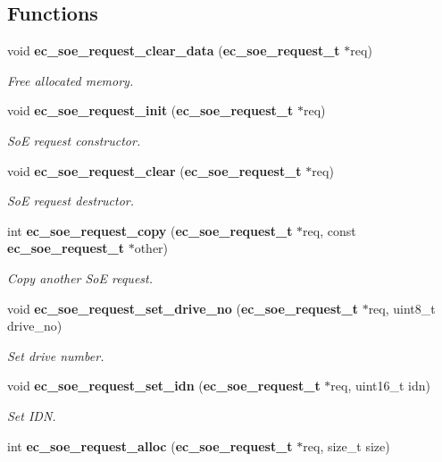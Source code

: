 \subsection*{Functions}
\begin{DoxyCompactItemize}
\item 
void {\bf ec\-\_\-soe\-\_\-request\-\_\-clear\-\_\-data} ({\bf ec\-\_\-soe\-\_\-request\-\_\-t} $\ast$req)
\begin{DoxyCompactList}\small\item\em Free allocated memory. \end{DoxyCompactList}\item 
void {\bf ec\-\_\-soe\-\_\-request\-\_\-init} ({\bf ec\-\_\-soe\-\_\-request\-\_\-t} $\ast$req)
\begin{DoxyCompactList}\small\item\em So\-E request constructor. \end{DoxyCompactList}\item 
void {\bf ec\-\_\-soe\-\_\-request\-\_\-clear} ({\bf ec\-\_\-soe\-\_\-request\-\_\-t} $\ast$req)
\begin{DoxyCompactList}\small\item\em So\-E request destructor. \end{DoxyCompactList}\item 
int {\bf ec\-\_\-soe\-\_\-request\-\_\-copy} ({\bf ec\-\_\-soe\-\_\-request\-\_\-t} $\ast$req, const {\bf ec\-\_\-soe\-\_\-request\-\_\-t} $\ast$other)
\begin{DoxyCompactList}\small\item\em Copy another So\-E request. \end{DoxyCompactList}\item 
void {\bf ec\-\_\-soe\-\_\-request\-\_\-set\-\_\-drive\-\_\-no} ({\bf ec\-\_\-soe\-\_\-request\-\_\-t} $\ast$req, uint8\-\_\-t drive\-\_\-no)
\begin{DoxyCompactList}\small\item\em Set drive number. \end{DoxyCompactList}\item 
void {\bf ec\-\_\-soe\-\_\-request\-\_\-set\-\_\-idn} ({\bf ec\-\_\-soe\-\_\-request\-\_\-t} $\ast$req, uint16\-\_\-t idn)
\begin{DoxyCompactList}\small\item\em Set I\-D\-N. \end{DoxyCompactList}\item 
int {\bf ec\-\_\-soe\-\_\-request\-\_\-alloc} ({\bf ec\-\_\-soe\-\_\-request\-\_\-t} $\ast$req, size\-\_\-t size)

\end{DoxyCompactItemize}
